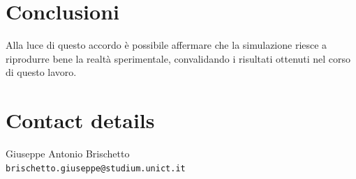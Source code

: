 \documentclass[10pt,foldmark,notumble]{leaflet}
\begin{document}
\section{Conclusioni}



Alla luce di questo accordo è possibile affermare che la simulazione riesce a riprodurre bene la realtà sperimentale, convalidando i risultati ottenuti nel corso di questo lavoro.














\section{Contact details}

Giuseppe Antonio Brischetto\\ {\tt brischetto.giuseppe@studium.unict.it}
\end{document}
